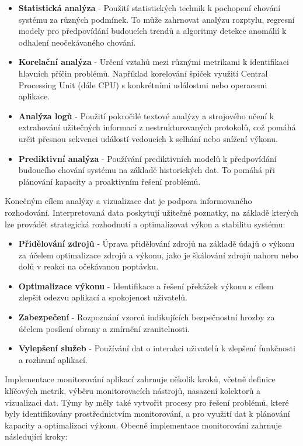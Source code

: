 \begin{itemize}
    \item \textbf{Statistická analýza} - Použití statistických technik k pochopení chování systému za různých podmínek. To může zahrnovat analýzu rozptylu, regresní modely pro předpovídání budoucích trendů a algoritmy detekce anomálií k odhalení neočekávaného chování.
    \item \textbf{Korelační analýza} - Určení vztahů mezi různými metrikami k identifikaci hlavních příčin problémů. Například korelování špiček využití Central Processing Unit (dále CPU) s konkrétními událostmi nebo operacemi aplikace.
    \item \textbf{Analýza logů} - Použití pokročilé textové analýzy a strojového učení k extrahování užitečných informací z nestrukturovaných protokolů, což pomáhá určit přesnou sekvenci událostí vedoucích k selhání nebo snížení výkonu.
    \item \textbf{Prediktivní analýza} - Používání prediktivních modelů k předpovídání budoucího chování systému na základě historických dat. To pomáhá při plánování kapacity a proaktivním řešení problémů.
\end{itemize}


Konečným cílem analýzy a vizualizace dat je podpora informovaného rozhodování. Interpretovaná data poskytují užitečné poznatky, na základě kterých lze provádět strategická rozhodnutí a optimalizovat výkon a stabilitu systému:

\begin{itemize}
    \item \textbf{Přidělování zdrojů} - Úprava přidělování zdrojů na základě údajů o výkonu za účelem optimalizace zdrojů a výkonu, jako je škálování zdrojů nahoru nebo dolů v reakci na očekávanou poptávku.
    \item \textbf{Optimalizace výkonu} - Identifikace a řešení překážek výkonu s cílem zlepšit odezvu aplikací a spokojenost uživatelů.
    \item \textbf{Zabezpečení} - Rozpoznání vzorců indikujících bezpečnostní hrozby za účelem posílení obrany a zmírnění zranitelnosti.
    \item \textbf{Vylepšení služeb} - Používání dat o interakci uživatelů k zlepšení funkčnosti a rozhraní aplikací.
\end{itemize}


Implementace monitorování aplikací zahrnuje několik kroků, včetně definice klíčových metrik, výběru monitorovacích nástrojů, nasazení kolektorů a vizualizaci dat. Týmy by měly také vytvořit procesy pro řešení problémů, které byly identifikovány prostřednictvím monitorování, a pro využití dat k plánování kapacity a optimalizaci výkonu. Obecně implementace monitorování zahrnuje následující kroky:

